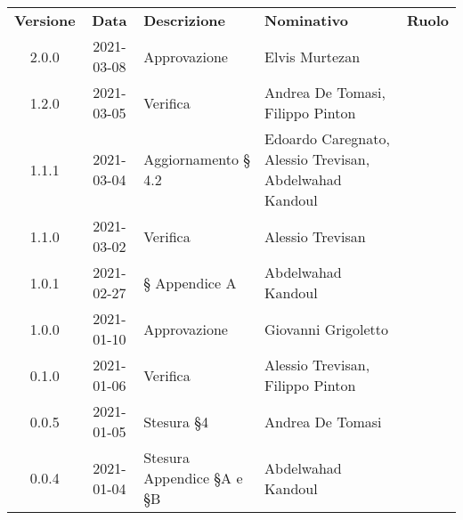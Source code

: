 {
    \renewcommand{\arraystretch}{1.5}
    \centering
    \begin{longtable}{ c c  C{3.5cm}  C{4cm}  c }
        \rowcolor{\primaryColor}
        \textcolor{\secondaryColor}{
        \textbf{Versione}}     & \textcolor{\secondaryColor}{\textbf{Data}}       & \textcolor{\secondaryColor}
        {\textbf{Descrizione}} & \textcolor{\secondaryColor}{\textbf{Nominativo}} & \textcolor{\secondaryColor}{\textbf{Ruolo}}                          \\


        2.0.0                  & 2021-03-08                                       & Approvazione             & Elvis Murtezan & \responsabile{}\\
        1.2.0                  & 2021-03-05                                       & Verifica             & Andrea De Tomasi, Filippo Pinton & \verificatore{}\\
        1.1.1                  & 2021-03-04                                       & Aggiornamento § 4.2              &Edoardo Caregnato, Alessio Trevisan, Abdelwahad Kandoul & \verificatore{}\\
        1.1.0                  & 2021-03-02                                       & Verifica             & Alessio Trevisan & \verificatore{}\\
        1.0.1                  & 2021-02-27                                       & § Appendice A             &Abdelwahad Kandoul & \verificatore{}\\
        1.0.0                  & 2021-01-10                                       & Approvazione                                 &Giovanni Grigoletto & \responsabile{}\\
        0.1.0                  & 2021-01-06                                       & Verifica                                     & Alessio Trevisan, Filippo Pinton &\verificatore{}\\
        0.0.5                  & 2021-01-05                                       & Stesura §4                                   & Andrea De Tomasi & \verificatore{} \\
        0.0.4                  & 2021-01-04                                       & Stesura Appendice §A e §B                    & Abdelwahad Kandoul & \verificatore{} \\

\end{longtable}}
